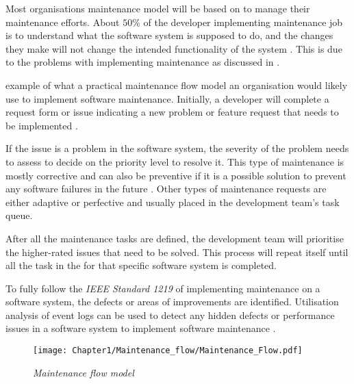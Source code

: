 Most organisations maintenance model will be based on  to manage their maintenance efforts. About $50\%$ of the developer implementing maintenance job is to understand what the software system is supposed to do, and the changes they make will not change the intended functionality of the system \cite{Tang2010, Zhuo}. This is due to the problems with implementing maintenance as discussed in .\par {} example of what a practical maintenance flow model an organisation would likely use to implement software maintenance. Initially, a developer will complete a request form or issue indicating a new problem or feature request that needs to be implemented \cite{Tang2010}.\par If the issue is a problem in the software system, the severity of the problem needs to assess to decide on the priority level to resolve it. This type of maintenance is mostly corrective and can also be preventive if it is a possible solution to prevent any software failures in the future \cite{Tang2010}. Other types of maintenance requests are either adaptive or perfective and usually placed in the development team's task queue.\par After all the maintenance tasks are defined, the development team will prioritise the higher-rated issues that need to be solved. This process will repeat itself until all the task in the for that specific software system is completed.\par To fully follow the \textit{IEEE Standard 1219} of implementing maintenance on a software system, the defects or areas of improvements are identified. Utilisation analysis of event logs can be used to detect any hidden defects or performance issues in a software system to implement software maintenance \cite{Cinque2013, Rong2018a, Levin2019}.

\begin{figure}[!htb] %
	\centering %
	\texttt{[image: Chapter1/Maintenance\_flow/Maintenance\_Flow.pdf]}
	\caption[Maintenance flow model]
	{\textit{Maintenance flow model \cite{Tang2010}}} \label{fig:CH1_MaintenanceFlow}
\end{figure}

\clearpage

